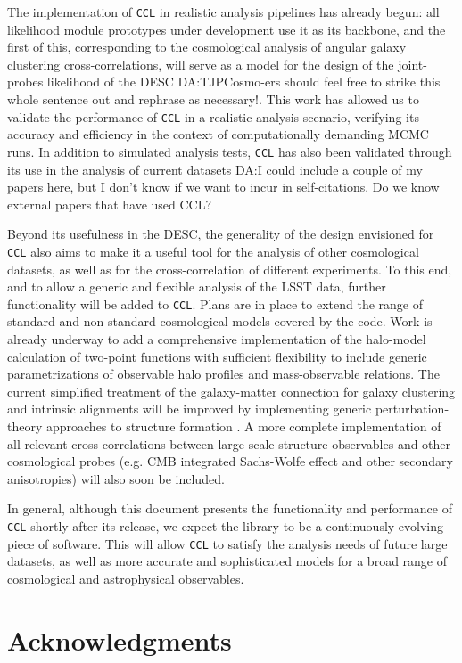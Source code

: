\documentclass[\docopts]{\docclass}
\newcommand{\damonge}[1]{\textcolor{green!55!blue}{DA:#1}}
\newcommand{\ccl}{{\tt CCL}\xspace}
\begin{document}
The implementation of \ccl in realistic analysis pipelines has already begun: all likelihood module prototypes under development use it as its backbone, and the first of this, corresponding to the cosmological analysis of angular galaxy clustering cross-correlations, will serve as a model for the design of the joint-probes likelihood of the DESC \damonge{TJPCosmo-ers should feel free to strike this whole sentence out and rephrase as necessary!}. This work has allowed us to validate the performance of \ccl in a realistic analysis scenario, verifying its accuracy and efficiency in the context of computationally demanding MCMC runs. In addition to simulated analysis tests, \ccl has also been validated through its use in the analysis of current datasets \damonge{I could include a couple of my papers here, but I don't know if we want to incur in self-citations. Do we know external papers that have used CCL?}

Beyond its usefulness in the DESC, the generality of the design envisioned for \ccl also aims to make it a useful tool for the analysis of other cosmological datasets, as well as for the cross-correlation of different experiments. To this end, and to allow a generic and flexible analysis of the LSST data, further functionality will be added to \ccl. Plans are in place to extend the range of standard and non-standard cosmological models covered by the code. Work is already underway to add a comprehensive implementation of the halo-model calculation of two-point functions \citep{Peacock2000} with sufficient flexibility to include generic parametrizations of observable halo profiles and mass-observable relations. The current simplified treatment of the galaxy-matter connection for galaxy clustering and intrinsic alignments will be improved by implementing generic perturbation-theory approaches to structure formation \citep{2009JCAP...08..020M,2016JCAP...09..015M}. A more complete implementation of all relevant cross-correlations between large-scale structure observables and other cosmological probes (e.g. CMB integrated Sachs-Wolfe effect \citep{1967ApJ...147...73S} and other secondary anisotropies) will also soon be included.

In general, although this document presents the functionality and performance of \ccl shortly after its release, we expect the library to be a continuously evolving piece of software. This will allow \ccl to satisfy the analysis needs of future large datasets, as well as more accurate and sophisticated models for a broad range of cosmological and astrophysical observables.

\section*{Acknowledgments}

\vskip 5pt


\vskip 5pt



\end{document}

